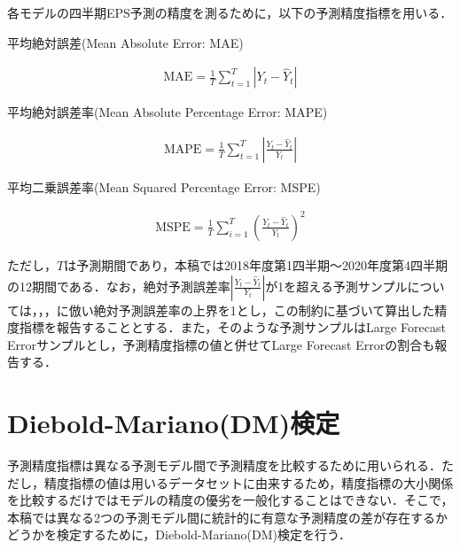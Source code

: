 \documentclass[a4paper，12pt]{jsarticle}
\begin{document}
各モデルの四半期EPS予測の精度を測るために，以下の予測精度指標を用いる．

平均絶対誤差(Mean Absolute Error: MAE)

\begin{equation}
  \begin{split}
    \text{MAE} = \frac {1} {T} \sum^{T}_{t=1}\left| Y_t - \hat{Y}_t \right|
  \end{split}
\end{equation}

平均絶対誤差率(Mean Absolute Percentage Error: MAPE)

\begin{equation}
  \begin{split}
    \text{MAPE} = \frac {1} {T} \sum^{T}_{t=1}\left| \frac {Y_t - \hat{Y}_t} {Y_t} \right|
  \end{split}
\end{equation}

平均二乗誤差率(Mean Squared Percentage Error: MSPE)

\begin{equation}
  \begin{split}
    \text{MSPE} = \frac {1} {T} \sum^{T}_{i=1} \left( \frac {Y_t - \hat{Y}_t} {Y_t} \right) ^2
  \end{split}
\end{equation}

ただし，$T$は予測期間であり，本稿では2018年度第1四半期～2020年度第4四半期の12期間である．なお，絶対予測誤差率$ \left| \frac{Y_t -{\hat Y}_t}{Y_t} \right|$が1を超える予測サンプルについては，\cite*{brown1979univariate}，\cite*{lorek1996multivariate}，\cite{zhang2004neural}に倣い絶対予測誤差率の上界を1とし，この制約に基づいて算出した精度指標を報告することとする．また，そのような予測サンプルはLarge Forecast Errorサンプルとし，予測精度指標の値と併せてLarge Forecast Errorの割合も報告する．

\section{Diebold-Mariano(DM)検定}

予測精度指標は異なる予測モデル間で予測精度を比較するために用いられる．ただし，精度指標の値は用いるデータセットに由来するため，精度指標の大小関係を比較するだけではモデルの精度の優劣を一般化することはできない．そこで，本稿では異なる2つの予測モデル間に統計的に有意な予測精度の差が存在するかどうかを検定するために，Diebold-Mariano(DM)検定\citep*{diebold2002comparing}を行う．
\end{document}
